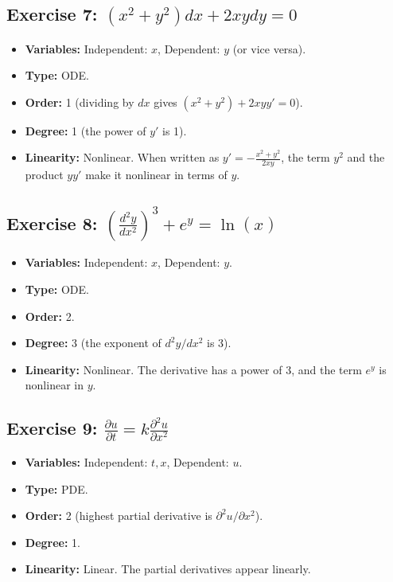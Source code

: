 \documentclass[11pt,letterpaper]{article}
\begin{document}
\subsection*{Exercise 7: $(x^2 + y^2)dx + 2xydy = 0$}
\begin{itemize}
    \item \textbf{Variables:} Independent: $x$, Dependent: $y$ (or vice versa).
    \item \textbf{Type:} ODE.
    \item \textbf{Order:} 1 (dividing by $dx$ gives $(x^2+y^2) + 2xy y' = 0$).
    \item \textbf{Degree:} 1 (the power of $y'$ is 1).
    \item \textbf{Linearity:} Nonlinear. When written as $y' = -\frac{x^2+y^2}{2xy}$, the term $y^2$ and the product $y y'$ make it nonlinear in terms of $y$.
\end{itemize}

\subsection*{Exercise 8: $\left(\frac{d^2 y}{dx^2}\right)^3 + e^y = \ln(x)$}
\begin{itemize}
    \item \textbf{Variables:} Independent: $x$, Dependent: $y$.
    \item \textbf{Type:} ODE.
    \item \textbf{Order:} 2.
    \item \textbf{Degree:} 3 (the exponent of $d^2y/dx^2$ is 3).
    \item \textbf{Linearity:} Nonlinear. The derivative has a power of 3, and the term $e^y$ is nonlinear in $y$.
\end{itemize}

\subsection*{Exercise 9: $\frac{\partial u}{\partial t} = k \frac{\partial^2 u}{\partial x^2}$}
\begin{itemize}
    \item \textbf{Variables:} Independent: $t, x$, Dependent: $u$.
    \item \textbf{Type:} PDE.
    \item \textbf{Order:} 2 (highest partial derivative is $\partial^2 u/\partial x^2$).
    \item \textbf{Degree:} 1.
    \item \textbf{Linearity:} Linear. The partial derivatives appear linearly.
\end{itemize}
\end{document}
